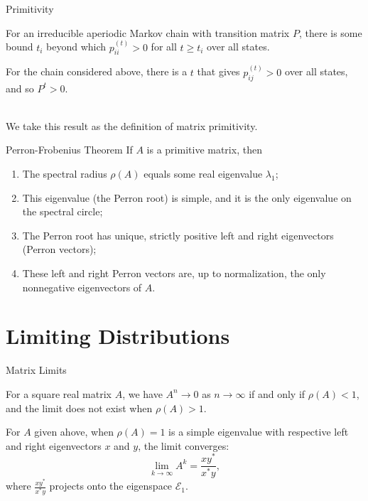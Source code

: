 \documentclass{beamer}
\newcommand{\iter}[2]{#1^{(#2)}}
\newcommand{\iter}[2]{#1^{(#2)}}
\begin{document}
\begin{frame}{Primitivity}
    \begin{lemma}
        For an irreducible aperiodic Markov chain with transition matrix $P$, there is some bound $t_i$ beyond which $\iter{p}{t}_{ii} > 0$ for all $t \geq t_i$ over all states.
    \end{lemma}
    
    \begin{theorem}
        For the chain considered above, there is a $t$ that gives $\iter{p}{t}_{ij} > 0$ over all states, and so $P^t > 0$.
    \end{theorem}\\
    \vspace{2mm}
    We take this result as the definition of matrix primitivity.
\end{frame}

\begin{frame}{Perron-Frobenius Theorem}
	If $A$ is a primitive matrix, then
	\begin{enumerate}
		\item The spectral radius $\rho(A)$ equals some real eigenvalue $\lambda_1$;
		\item This eigenvalue (the Perron root) is simple, and it is the only eigenvalue on the spectral circle;
		\item The Perron root has unique, strictly positive left and right eigenvectors (Perron vectors);
		\item These left and right Perron vectors are, up to normalization, the only nonnegative eigenvectors of $A$.
	\end{enumerate}
\end{frame}

\section{Limiting Distributions}
\begin{frame}{Matrix Limits}
    \begin{theorem}
       For a square real matrix $A$, we have $A^n \to 0$ as $n\to\infty$ if and only if $\rho(A) < 1$, and the limit does not exist when $\rho(A) > 1$.
    \end{theorem}
    
    \begin{theorem}
        For $A$ given ahove, when $\rho(A) = 1$ is a simple eigenvalue with respective left and right eigenvectors $x$ and $y$, the limit converges:
        \begin{equation*}
            \lim_{k\to\infty}{A^k} = \frac{x y^*}{x^* y},
        \end{equation*}
        where $\frac{x y^*}{x^* y}$ projects onto the eigenspace $\mathcal{E}_1$.
    \end{theorem}
\end{frame}
\end{document}
